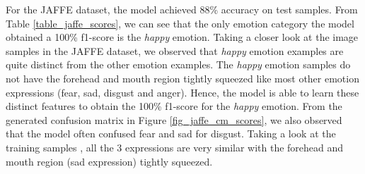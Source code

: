 \documentclass[master]{thesis-uestc}
\begin{document}
For the JAFFE dataset, the model achieved 88\% accuracy on test samples. From Table \ref{table_jaffe_scores}, we can see that the only emotion category the model obtained a 100\% f1-score is the \textit{happy} emotion. Taking a closer look at the image samples in the JAFFE dataset, we observed that \textit{happy} emotion examples are quite distinct from the other emotion examples. The \textit{happy} emotion samples do not have the forehead and mouth region tightly squeezed like most other emotion expressions (fear, sad, disgust and anger). Hence, the model is able to learn these distinct features to obtain the 100\% f1-score for the \textit{happy} emotion. From the generated confusion matrix in Figure \ref{fig_jaffe_cm_scores}, we also observed that the model often confused fear and sad for disgust. Taking a look at the training samples , all the 3 expressions are very similar with the forehead and mouth region (sad expression) tightly squeezed. 



\end{document}
